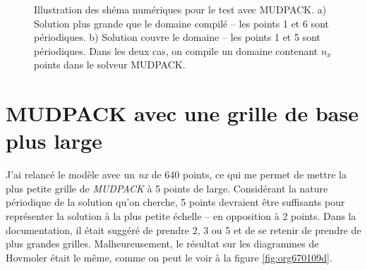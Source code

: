 \documentclass[10pt]{article}
\numberwithin{equation}{section}
\begin{document}
\begin{figure}[!h]
\begin{center}
\hspace{2cm}
\end{center}
\caption{\label{org7c1ef2c}Illustration des shéma numériques pour le test avec MUDPACK. a) Solution plus grande que le domaine compilé -- les points 1 et 6 sont périodiques. b) Solution couvre le domaine --  les points 1 et 5 sont périodiques. Dans les deux cas, on compile un domaine contenant \(n_x\) points dans le solveur MUDPACK.}
\end{figure}


\section{MUDPACK avec une grille de base plus large}
\label{sec:org8842525}
J'ai relancé le modèle avec un \emph{nx} de 640 points, ce qui me permet de mettre la plus petite grille de \emph{MUDPACK} à 5 points de large.
Considérant la nature périodique de la solution qu'on cherche, 5 points devraient être suffisants pour représenter la solution à la plus petite échelle -- en opposition à 2 points.
Dans la documentation, il était suggéré de prendre 2, 3 ou 5 et de se retenir de prendre de plus grandes grilles.
Malheureusement, le résultat sur les diagrammes de Hovmoler était le même, comme on peut le voir à la figure \ref{fig:org670109d}.
\end{document}
